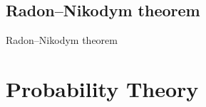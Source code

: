 \documentclass[utf-8, 10pt, aspectratio=1610]{beamer}
\begin{document}
\subsection{Radon–Nikodym theorem}
\begin{frame}[allowframebreaks]{Radon–Nikodym theorem}
	\vspace*{\fill}
	\begin{definition}

	\end{definition}
	\vspace*{\fill}
	\framebreak
	\vspace*{\fill}
	\begin{definition}

	\end{definition}
	\vspace*{\fill}
\end{frame}


\section{Probability Theory}
\end{document}
